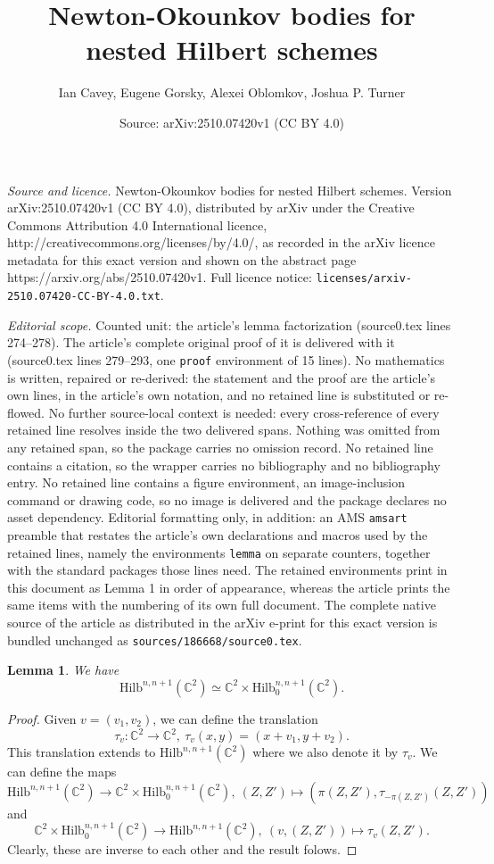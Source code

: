 \documentclass[10pt,a4paper]{amsart}
\title{Newton-Okounkov bodies for nested Hilbert schemes}
\author{Ian Cavey, Eugene Gorsky, Alexei Oblomkov, Joshua P. Turner}
\date{Source: arXiv:2510.07420v1 (CC BY 4.0)}
\newtheorem{lemma}{Lemma}
\newcommand{\C}{\mathbb{C}}
\newcommand{\Hilb}{\mathrm{Hilb}}
\begin{document}
\maketitle

\noindent\emph{Source and licence.} Newton-Okounkov bodies for nested Hilbert schemes. Version arXiv:2510.07420v1 (CC BY 4.0), distributed by arXiv under the Creative Commons Attribution 4.0 International licence, http://creativecommons.org/licenses/by/4.0/, as recorded in the arXiv licence metadata for this exact version and shown on the abstract page https://arxiv.org/abs/2510.07420v1. Full licence notice: \texttt{licenses/arxiv-2510.07420-CC-BY-4.0.txt}.\par\smallskip

\noindent\textit{Editorial scope.} Counted unit: the article's lemma factorization (source0.tex lines 274--278). The article's complete original proof of it is delivered with it (source0.tex lines 279--293, one \texttt{proof} environment of 15 lines). No mathematics is written, repaired or re-derived: the statement and the proof are the article's own lines, in the article's own notation, and no retained line is substituted or re-flowed.  No further source-local context is needed: every cross-reference of every retained line resolves inside the two delivered spans.  Nothing was omitted from any retained span, so the package carries no omission record.  No retained line contains a citation, so the wrapper carries no bibliography and no bibliography entry.  No retained line contains a figure environment, an image-inclusion command or drawing code, so no image is delivered and the package declares no asset dependency.  Editorial formatting only, in addition: an AMS \texttt{amsart} preamble that restates the article's own declarations and macros used by the retained lines, namely the environments \texttt{lemma} on separate counters, together with the standard packages those lines need.  The retained environments print in this document as Lemma 1 in order of appearance, whereas the article prints the same items with the numbering of its own full document.  The complete native source of the article as distributed in the arXiv e-print for this exact version is bundled unchanged as \texttt{sources/186668/source0.tex}.
\begin{lemma}
\label{lem: factorization}
We have
\[ \Hilb^{n,n+1}(\C^2) \simeq \C^2 \times \Hilb^{n,n+1}_0(\C^2). \]
\end{lemma}

\begin{proof}
Given $v=(v_1,v_2)$, we can define the translation 
$$
\tau_v:\C^2\to \C^2,\ \tau_v(x,y)=(x+v_1,y+v_2).
$$
This translation extends to $\Hilb^{n,n+1}(\C^2)$ where we also denote it by $\tau_v$. We can define the maps
$$
\Hilb^{n,n+1}(\C^2) \to \C^2 \times \Hilb^{n,n+1}_0(\C^2),\ (Z,Z')\mapsto (\pi(Z,Z'),\tau_{-\pi(Z,Z')}(Z,Z'))
$$
and
$$
\C^2 \times \Hilb^{n,n+1}_0(\C^2)\to \Hilb^{n,n+1}(\C^2),\ (v,(Z,Z'))\mapsto \tau_{v}(Z,Z').
$$
Clearly, these are inverse to each other and the result folows.
\end{proof}
\end{document}
